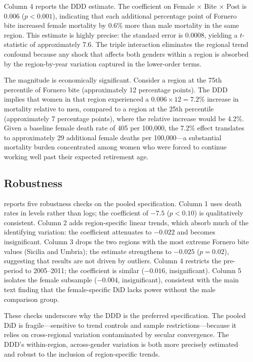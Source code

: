 \documentclass[12pt]{article}
\begin{document}
Column 4 reports the DDD estimate. The coefficient on Female $\times$ Bite $\times$ Post is 0.006 ($p < 0.001$), indicating that each additional percentage point of Fornero bite increased female mortality by 0.6\% more than male mortality in the same region. This estimate is highly precise: the standard error is 0.0008, yielding a $t$-statistic of approximately 7.6. The triple interaction eliminates the regional trend confound because any shock that affects both genders within a region is absorbed by the region-by-year variation captured in the lower-order terms.

The magnitude is economically significant. Consider a region at the 75th percentile of Fornero bite (approximately 12 percentage points). The DDD implies that women in that region experienced a $0.006 \times 12 = 7.2\%$ increase in mortality relative to men, compared to a region at the 25th percentile (approximately 7 percentage points), where the relative increase would be 4.2\%. Given a baseline female death rate of 405 per 100,000, the 7.2\% effect translates to approximately 29 additional female deaths per 100,000---a substantial mortality burden concentrated among women who were forced to continue working well past their expected retirement age.



\subsection{Robustness}

 reports five robustness checks on the pooled specification. Column 1 uses death rates in levels rather than logs; the coefficient of $-7.5$ ($p < 0.10$) is qualitatively consistent. Column 2 adds region-specific linear trends, which absorb much of the identifying variation: the coefficient attenuates to $-0.022$ and becomes insignificant. Column 3 drops the two regions with the most extreme Fornero bite values (Sicilia and Umbria); the estimate strengthens to $-0.025$ ($p = 0.02$), suggesting that results are not driven by outliers. Column 4 restricts the pre-period to 2005--2011; the coefficient is similar ($-0.016$, insignificant). Column 5 isolates the female subsample ($-0.004$, insignificant), consistent with the main text finding that the female-specific DiD lacks power without the male comparison group.

These checks underscore why the DDD is the preferred specification. The pooled DiD is fragile---sensitive to trend controls and sample restrictions---because it relies on cross-regional variation contaminated by secular convergence. The DDD's within-region, across-gender variation is both more precisely estimated and robust to the inclusion of region-specific trends.
\end{document}
